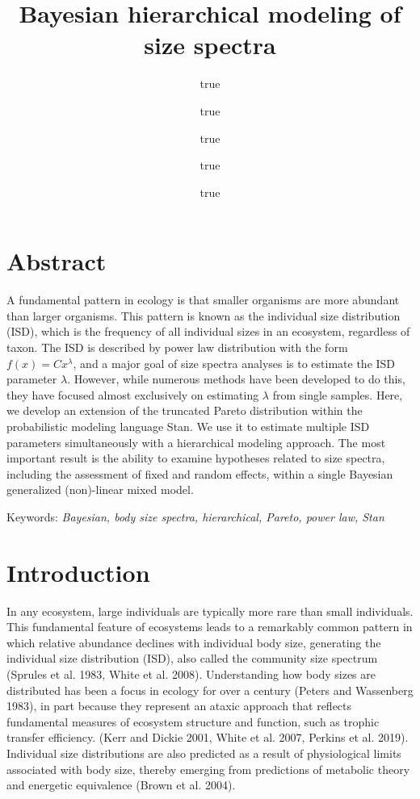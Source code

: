 \documentclass[
  12pt,
]{article}
\title{Bayesian hierarchical modeling of size spectra}
\author{true \and true \and true \and true \and true}
\date{}
\numberwithin{equation}
\begin{document}
\maketitle

\newpage

\hypertarget{abstract}{%
\section{Abstract}\label{abstract}}

A fundamental pattern in ecology is that smaller organisms are more
abundant than larger organisms. This pattern is known as the individual
size distribution (ISD), which is the frequency of all individual sizes
in an ecosystem, regardless of taxon. The ISD is described by power law
distribution with the form \(f(x) = Cx^{\lambda}\), and a major goal of
size spectra analyses is to estimate the ISD parameter \(\lambda\).
However, while numerous methods have been developed to do this, they
have focused almost exclusively on estimating \(\lambda\) from single
samples. Here, we develop an extension of the truncated Pareto
distribution within the probabilistic modeling language Stan. We use it
to estimate multiple ISD parameters simultaneously with a hierarchical
modeling approach. The most important result is the ability to examine
hypotheses related to size spectra, including the assessment of fixed
and random effects, within a single Bayesian generalized (non)-linear
mixed model.

Keywords: \emph{Bayesian, body size spectra, hierarchical, Pareto, power
law, Stan}

\newpage

\hypertarget{introduction}{%
\section{Introduction}\label{introduction}}

In any ecosystem, large individuals are typically more rare than small
individuals. This fundamental feature of ecosystems leads to a
remarkably common pattern in which relative abundance declines with
individual body size, generating the individual size distribution (ISD),
also called the community size spectrum (Sprules et al. 1983, White et
al. 2008). Understanding how body sizes are distributed has been a focus
in ecology for over a century (Peters and Wassenberg 1983), in part
because they represent an ataxic approach that reflects fundamental
measures of ecosystem structure and function, such as trophic transfer
efficiency. (Kerr and Dickie 2001, White et al. 2007, Perkins et al.
2019). Individual size distributions are also predicted as a result of
physiological limits associated with body size, thereby emerging from
predictions of metabolic theory and energetic equivalence (Brown et al.
2004).
\end{document}
